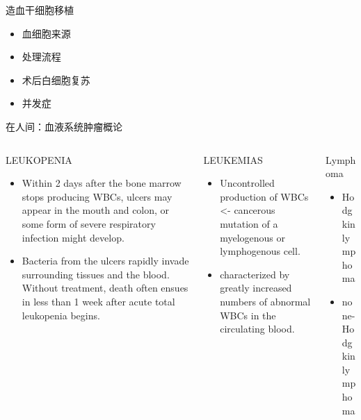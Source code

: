 \documentclass[
  ignorenonframetext,
]{beamer}
\begin{document}
\begin{frame}
\begin{block}{造血干细胞移植}
\protect\hypertarget{ux9020ux8840ux5e72ux7ec6ux80deux79fbux690d}{}
\begin{itemize}
\item
  血细胞来源
\item
  处理流程
\item
  术后白细胞复苏
\item
  并发症
\end{itemize}
\end{block}
\end{frame}

\begin{frame}{在人间：血液系统肿瘤概论}
\protect\hypertarget{ux5728ux4ebaux95f4ux8840ux6db2ux7cfbux7edfux80bfux7624ux6982ux8bba}{}
\begin{columns}[T]
\begin{column}{0.3\textwidth}
\begin{block}{LEUKOPENIA}
\protect\hypertarget{leukopenia}{}
\begin{itemize}
\item
  Within 2 days after the bone marrow stops producing WBCs, ulcers may
  appear in the mouth and colon, or some form of severe respiratory
  infection might develop.
\item
  Bacteria from the ulcers rapidly invade surrounding tissues and the
  blood. Without treatment, death often ensues in less than 1 week after
  acute total leukopenia begins.
\end{itemize}
\end{block}
\end{column}

\begin{column}{0.3\textwidth}
\begin{block}{LEUKEMIAS}
\protect\hypertarget{leukemias}{}
\begin{itemize}
\item
  Uncontrolled production of WBCs \textless- cancerous mutation of a
  myelogenous or lymphogenous cell.
\item
  characterized by greatly increased numbers of abnormal WBCs in the
  circulating blood.
\end{itemize}
\end{block}
\end{column}

\begin{column}{0.3\textwidth}
\begin{block}{Lymphoma}
\protect\hypertarget{lymphoma}{}
\begin{itemize}
\item
  Hodgkin lymphoma
\item
  none-Hodgkin lymphoma
\end{itemize}
\end{block}
\end{column}
\end{columns}
\end{frame}
\end{document}
